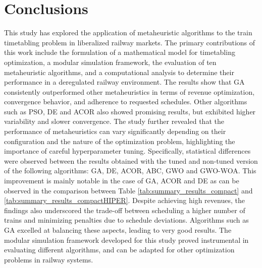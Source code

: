 \documentclass[Afour,sagev,times]{sagej}
\begin{document}

\section{Conclusions}
\label{sec:Conclusions}

This study has explored the application of metaheuristic algorithms to the train timetabling problem in liberalized railway markets. The primary contributions of this work include the formulation of a mathematical model for timetabling optimization, a modular simulation framework, the evaluation of ten metaheuristic algorithms, and a computational analysis to determine their performance in a deregulated railway environment. The results show that \gls{GA} consistently outperformed other metaheuristics in terms of revenue optimization, convergence behavior, and adherence to requested schedules. Other algorithms such as \gls{PSO}, \gls{DE} and \gls{ACOR} also showed promising results, but exhibited higher variability and slower convergence. The study further revealed that the performance of metaheuristics can vary significantly depending on their configuration and the nature of the optimization problem, highlighting the importance of careful hyperparameter tuning. Specifically, statistical differences were observed between the results obtained with the tuned and non-tuned version of the following algorithms: \gls{GA}, \gls{DE}, \gls{ACOR}, \gls{ABC}, \gls{GWO} and \gls{GWO-WOA}. This improvement is mainly notable in the case of \gls{GA}, \gls{ACOR} and \gls{DE} as can be observed in the comparison between Table \ref{tab:summary_results_compact} and \ref{tab:summary_results_compactHIPER}. Despite achieving high revenues, the findings also underscored the trade-off between scheduling a higher number of trains and minimizing penalties due to schedule deviations. Algorithms such as \gls{GA} excelled at balancing these aspects, leading to very good results. The modular simulation framework developed for this study proved instrumental in evaluating different algorithms, and can be adapted for other optimization problems in railway systems.
\end{document}

